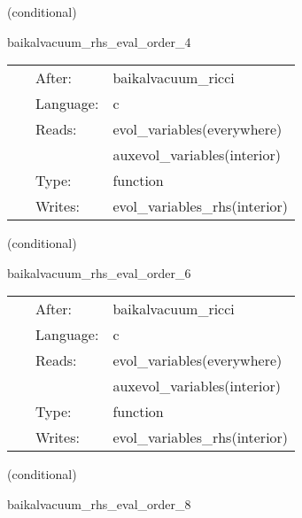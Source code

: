 \vspace{5mm}

   (conditional) 

\hspace{5mm} baikalvacuum\_rhs\_eval\_order\_4 

\hspace{5mm}{\it evaluate bssn rhss, at finite-differencing order 4 } 


\hspace{5mm}

 \begin{tabular*}{160mm}{cll} 
~ & After:  & baikalvacuum\_ricci \\ 
~ & Language:  & c \\ 
~ & Reads:  & evol\_variables(everywhere) \\ 
~& ~ &auxevol\_variables(interior)\\ 
~ & Type:  & function \\ 
~ & Writes:  & evol\_variables\_rhs(interior) \\ 
\end{tabular*} 


\vspace{5mm}

   (conditional) 

\hspace{5mm} baikalvacuum\_rhs\_eval\_order\_6 

\hspace{5mm}{\it evaluate bssn rhss, at finite-differencing order 6 } 


\hspace{5mm}

 \begin{tabular*}{160mm}{cll} 
~ & After:  & baikalvacuum\_ricci \\ 
~ & Language:  & c \\ 
~ & Reads:  & evol\_variables(everywhere) \\ 
~& ~ &auxevol\_variables(interior)\\ 
~ & Type:  & function \\ 
~ & Writes:  & evol\_variables\_rhs(interior) \\ 
\end{tabular*} 


\vspace{5mm}

   (conditional) 

\hspace{5mm} baikalvacuum\_rhs\_eval\_order\_8 

